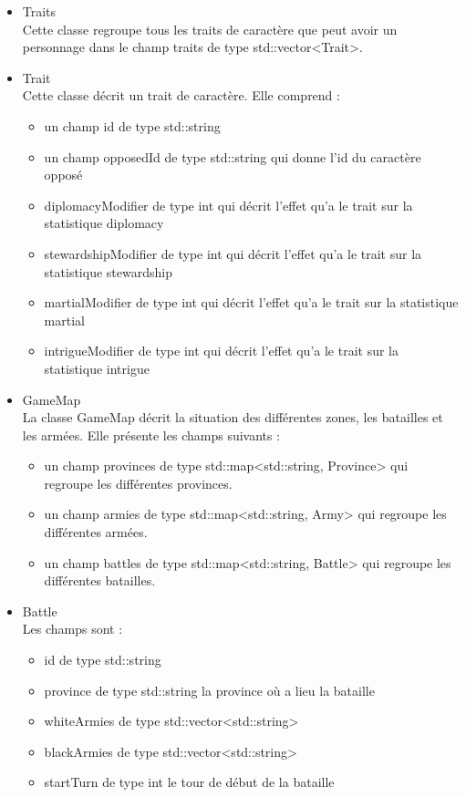 \documentclass[a4paper,12pt]{article}
\begin{document}
\begin{itemize}
\item Traits\\
Cette classe regroupe tous les traits de caractère que peut avoir un personnage dans le champ traits de type std::vector<Trait>.
\item Trait\\
Cette classe décrit un trait de caractère. Elle comprend :
\begin{itemize}
\item un champ id de type std::string
\item un champ opposedId de type std::string qui donne l'id du caractère opposé
\item diplomacyModifier de type int qui décrit l'effet qu'a le trait sur la statistique diplomacy
\item stewardshipModifier de type int qui décrit l'effet qu'a le trait sur la statistique stewardship
\item martialModifier de type int qui décrit l'effet qu'a le trait sur la statistique martial
\item intrigueModifier de type int qui décrit l'effet qu'a le trait sur la statistique intrigue
\end{itemize}
\item GameMap\\
La classe GameMap décrit la situation des différentes zones, les batailles et les armées. 
Elle présente les champs suivants :
\begin{itemize}
\item un champ provinces de type std::map<std::string, Province> qui regroupe les différentes provinces.
\item un champ armies de type std::map<std::string, Army> qui regroupe les différentes armées.
\item un champ battles de type std::map<std::string, Battle> qui regroupe les différentes batailles.
\end{itemize} 
\item Battle\\
Les champs sont :
\begin{itemize}
\item id de type std::string
\item province de type std::string la province où a lieu la bataille
\item whiteArmies de type std::vector<std::string>
\item blackArmies de type std::vector<std::string>
\item startTurn de type int le tour de début de la bataille

\end{itemize}
\end{itemize}
\end{document}
